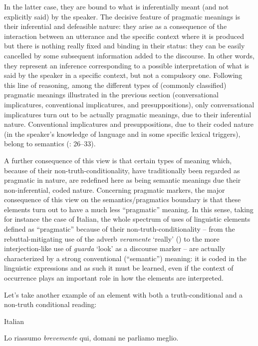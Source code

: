 In the latter case, they are bound to what is inferentially meant (and not explicitly said) by the speaker. The decisive feature of pragmatic meanings is their inferential and defeasible nature: they arise as a consequence of the interaction between an utterance and the specific context where it is produced but there is nothing really fixed and binding in their status: they can be easily cancelled by some subsequent information added to the discourse. In other words, they represent an inference corresponding to a possible interpretation of what is said by the speaker in a specific context, but not a compulsory one. Following this line of reasoning, among the different types of (commonly classified) pragmatic meanings illustrated in the previous section (conversational implicatures, conventional implicatures, and presuppositions), only conversational implicatures turn out to be actually pragmatic meanings, due to their inferential nature. Conventional implicatures and presuppositions, due to their coded nature (in the speaker’s knowledge of language and in some specific lexical triggers), belong to semantics (\citealt{Hansen2008}: 26–33).

A further consequence of this view is that certain types of meaning which, because of their non-truth-conditionality, have traditionally been regarded as pragmatic in nature, are redefined here as being semantic meanings due their non-inferential, coded nature. Concerning pragmatic markers, the major consequence of this view on the semantics/pragmatics boundary is that these elements turn out to have a much less “pragmatic” meaning. In this sense, taking for instance the case of Italian, the whole spectrum of uses of linguistic elements defined as “pragmatic” because of their non-truth-conditionality – from the rebuttal-mitigating use of the adverb \textit{veramente} ‘really’ (\citealt{RiccaVisconti2014}) to the more interjection-like use of \textit{guarda} ‘look’ as a discourse marker \citep{Waltereit2002} – are actually characterized by a strong conventional (“semantic”) meaning: it is coded in the linguistic expressions and as such it must be learned, even if the context of occurrence plays an important role in how the elements are interpreted.

Let’s take another example of an element with both a truth-conditional and a non-truth conditional reading:

\ea%
    \label{ex:key:10}
          Italian

\ea \label{ex:key:10a}  Lo riassumo \textit{brevemente} qui, domani ne parliamo meglio.

